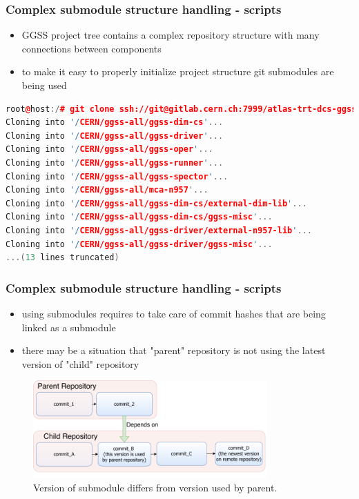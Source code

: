 \documentclass[10pt]{beamer}
\begin{document}
\begin{frame}[fragile]
\frametitle{Complex submodule structure handling - scripts}
\begin{itemize}
\item GGSS project tree contains a complex repository structure with many connections between components
\item to make it easy to properly initialize project structure git submodules are being used
\end{itemize}
\begin{lstlisting}[language=c++, caption={Initialize project structure with one command.}]
root@host:/# git clone ssh://git@gitlab.cern.ch:7999/atlas-trt-dcs-ggss/ggss-all.git && cd ggss-all && git submodule update --init --recursive
Cloning into '/CERN/ggss-all/ggss-dim-cs'...
Cloning into '/CERN/ggss-all/ggss-driver'...
Cloning into '/CERN/ggss-all/ggss-oper'...
Cloning into '/CERN/ggss-all/ggss-runner'...
Cloning into '/CERN/ggss-all/ggss-spector'...
Cloning into '/CERN/ggss-all/mca-n957'...
Cloning into '/CERN/ggss-all/ggss-dim-cs/external-dim-lib'...
Cloning into '/CERN/ggss-all/ggss-dim-cs/ggss-misc'...
Cloning into '/CERN/ggss-all/ggss-driver/external-n957-lib'...
Cloning into '/CERN/ggss-all/ggss-driver/ggss-misc'...
...(13 lines truncated)
\end{lstlisting}
\end{frame}

\begin{frame}[fragile]
\frametitle{Complex submodule structure handling - scripts}
\begin{itemize}
\item using submodules requires to take care of commit hashes that are being linked as a submodule
\item there may be a situation that "parent" repository is not using the latest version of "child" repository
\end{itemize}
\begin{figure}
    \centering
    \includegraphics[width=0.8\textwidth]{resources/submodules_problem.pdf}
    \caption{Version of submodule differs from version used by parent.}
\end{figure}
\end{frame}
\end{document}
